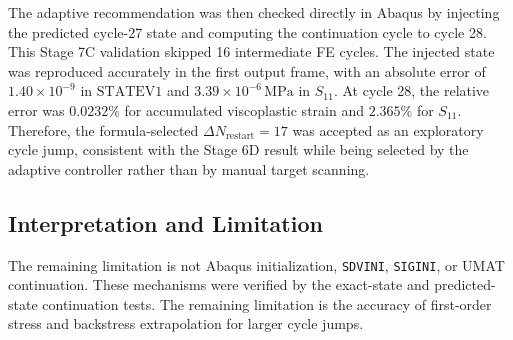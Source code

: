 The adaptive recommendation was then checked directly in Abaqus by injecting the predicted cycle-27 state and computing the continuation cycle to cycle 28. This Stage 7C validation skipped 16 intermediate FE cycles. The injected state was reproduced accurately in the first output frame, with an absolute error of \(1.40\times10^{-9}\) in \(\text{STATEV1}\) and \(3.39\times10^{-6}\,\mathrm{MPa}\) in \(S_{11}\). At cycle 28, the relative error was \(0.0232\%\) for accumulated viscoplastic strain and \(2.365\%\) for \(S_{11}\). Therefore, the formula-selected \(\Delta N_{\mathrm{restart}}=17\) was accepted as an exploratory cycle jump, consistent with the Stage 6D result while being selected by the adaptive controller rather than by manual target scanning.

\begin{table}[htbp]
\centering
\small
{}
\caption{Final cycle-jump validation summary. Stage 7B provides the grouped adaptive recommendation, while Stage 7C validates that recommendation through a direct Abaqus continuation run.}
\label{tab:final_cycle_jump_summary}
\end{table}

\subsection{Interpretation and Limitation}

The remaining limitation is not Abaqus initialization, \texttt{SDVINI}, \texttt{SIGINI}, or UMAT continuation. These mechanisms were verified by the exact-state and predicted-state continuation tests. The remaining limitation is the accuracy of first-order stress and backstress extrapolation for larger cycle jumps.

